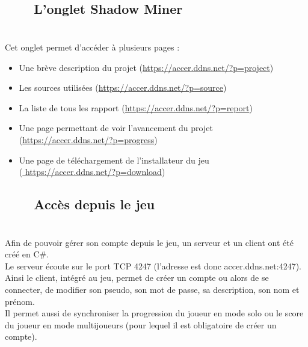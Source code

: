 \documentclass[titlepage, 13px, a4paper]{report}
\begin{document}
\subsection[L’onglet Shadow Miner]{~~~~L’onglet Shadow Miner}
\paragraph{} \hspace{0pt} \\
Cet onglet permet d’accéder à plusieurs pages : \\
{\begin{itemize}
	\item Une brève description du projet (\url{https://accer.ddns.net/?p=project})
	\item Les sources utilisées (\url{https://accer.ddns.net/?p=source})
	\item La liste de tous les rapport (\url{https://accer.ddns.net/?p=report})
	\item Une page permettant de voir l’avancement du projet \\
		(\url{https://accer.ddns.net/?p=progress})
	\item Une page de téléchargement de l’installateur du jeu \\
		(\url{ https://accer.ddns.net/?p=download}) \\
\end{itemize}}

\subsection[Accès depuis le jeu]{~~~~Accès depuis le jeu}
\paragraph{} \hspace{0pt} \\
Afin de pouvoir gérer son compte depuis le jeu, un serveur et un client ont été créé en C\#. \\
Le serveur écoute sur le port TCP 4247 (l’adresse est donc accer.ddns.net:4247). Ainsi le client, 
intégré au jeu, permet de créer un compte ou alors de se connecter, de modifier son pseudo, 
son mot de passe, sa description, son nom et prénom. \\
Il permet aussi de synchroniser la progression du joueur en mode solo ou le score du joueur 
en mode multijoueurs (pour lequel il est obligatoire de créer un compte). \\
\end{document}
